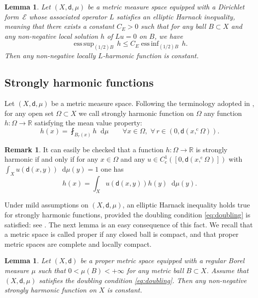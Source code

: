 \documentclass[10pt]{amsart}
\newcommand{\rmc}{\mathrm{c}}
\theoremstyle{plain}
\newtheorem{lemma}[theorem]{Lemma}
\theoremstyle{definition}
\newtheorem{remark}[theorem]{Remark}
\newcommand{\setR}{\mathbb{R}}
\newcommand{\cE}{\mathcal{E}}
\newcommand{\di}{\mathop{}\!\mathrm{d}}
\newcommand{\dist}{\mathsf{d}}
\DeclareMathOperator*{\essssup}{ess\,sup}
\DeclareMathOperator*{\esssinf}{ess\,inf}
\begin{document}
\begin{lemma}\label{lem:ellipticHarnack}
Let $(X,\dist,\mu)$ be a metric measure space equipped with a Dirichlet form~$\cE$ whose associated operator $L$ satisfies an elliptic Harnack inequality, meaning that there exists a constant $C_E>0$ such that for any ball $B \subset X$ and any non-negative local solution $h$ of $Lu=0$ on $B$, we have
\begin{equation}\label{eq:ellipticHarnack}
\essssup_{(1/2)B} \, h \le C_E \esssinf_{(1/2)B} \, h.
\end{equation}
Then any non-negative locally $L$-harmonic function is constant.
\end{lemma}

\subsection*{Strongly harmonic functions}

Let $(X,\dist,\mu)$ be a metric measure space. Following the terminology adopted in \cite{GaczkowskiGorka, AGG19}, for any open set $\Omega \subset X$ we call strongly harmonic function on $\Omega$ any function $h:\Omega\to\setR$ satisfying the mean value property:
\[
h(x) = \fint_{B_r(x)} h \di \mu \qquad \forall x \in \Omega, \, \, \forall \, r\in(0, \dist(x,^\rmc\!\Omega)).
\]
\begin{remark}\label{rem:defalternative}
It can easily be checked that a function $h:\Omega\to\setR$ is strongly harmonic if and only if for any $x\in \Omega$ and any $u\in C_\rmc^1\left(\left[0, \dist(x,^\rmc\!\Omega)\right]\right)$ with
$\int_X u(\dist(x,y))\di \mu(y) = 1$ one has
\[
h(x) = \int_{X}u\left(\dist(x,y)\right) h(y) \di \mu(y).
\]
\end{remark}
Under mild assumptions on $(X,\dist,\mu)$, an elliptic Harnack inequality holds true for strongly harmonic functions, provided the doubling condition \eqref{eq:doubling} is satisfied: see \cite[Lem.\,4.1]{AGG19}. The next lemma is an easy consequence of this fact. We recall that a metric space is called proper if any closed ball is compact, and that proper metric spaces are complete and locally compact.

\begin{lemma}\label{lem:Harnackstrongly}
Let $(X,\dist)$ be a proper metric space equipped with a regular Borel measure $\mu$ such that $0<\mu(B)<+\infty$ for any metric ball $B \subset X$. Assume that $(X,\dist,\mu)$ satisfies the doubling condition \eqref{eq:doubling}. Then any non-negative strongly harmonic function on $X$ is constant.
\end{lemma}
\end{document}
